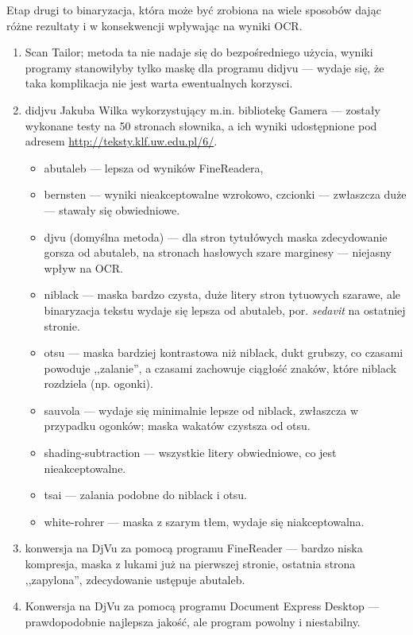 \documentclass[12]{mwart}
\newcommand{\program}[1]{\textsf{#1}}
\begin{document}
Etap drugi to binaryzacja, która może być zrobiona na wiele sposobów
dając różne rezultaty i w konsekwencji wpływając na wyniki
OCR. 
\begin{enumerate}
\item \program{Scan Tailor}; metoda ta nie nadaje się do
  bezpośredniego użycia, wyniki programy stanowiłyby tylko maskę dla
  programu \textsf{didjvu} --- wydaje się, że taka komplikacja nie
  jest warta ewentualnych korzysci.
\item \program{didjvu} Jakuba Wilka wykorzystujący m.in. bibliotekę
  \textsf{Gamera} --- zostały wykonane testy na 50 stronach słownika,
  a ich wyniki udostępnione pod adresem \url{http://teksty.klf.uw.edu.pl/6/}.
  \begin{itemize}
  \item abutaleb --- lepsza od wyników FineReadera,
  \item bernsten --- wyniki nieakceptowalne wzrokowo,  czcionki --- zwłaszcza duże --- stawały się obwiedniowe.
  \item djvu (domyślna metoda) --- dla stron tytułówych maska
    zdecydowanie gorsza od abutaleb, na stronach hasłowych szare
    marginesy --- niejasny wpływ na OCR.
  \item niblack --- maska bardzo czysta, duże litery stron tytuowych
    szarawe, ale binaryzacja tekstu wydaje się lepsza od abutaleb,
    por. \textit{sedavit} na ostatniej stronie.
  \item otsu --- maska bardziej kontrastowa niż niblack, dukt grubszy,
    co czasami powoduje ,,zalanie'', a czasami zachowuje ciągłość
    znaków, które niblack rozdziela (np. ogonki).
  \item sauvola --- wydaje się minimalnie lepsze od niblack, zwłaszcza
    w przypadku ogonków; maska wakatów czystsza od otsu.
  \item shading-subtraction --- wszystkie litery obwiedniowe, co jest
    nieakceptowalne.
  \item tsai --- zalania podobne do niblack i otsu.
  \item white-rohrer --- maska z szarym tłem, wydaje się niakceptowalna.
  \end{itemize}
\item konwersja na DjVu za pomocą programu \textsf{FineReader} ---
  bardzo niska kompresja, maska z lukami już na pierwszej stronie,
  ostatnia strona ,,zapylona'', zdecydowanie ustępuje abutaleb.
\item Konwersja na DjVu za pomocą programu \textsf{Document Express
    Desktop} --- prawdopodobnie najlepsza jakość, ale program powolny
  i niestabilny.
\end{enumerate}
\end{document}
